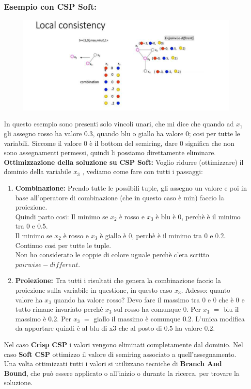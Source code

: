 \subsubsection{Esempio con CSP Soft:}
\begin{figure}[htp]
	\centering
    \includegraphics[width=14cm, keepaspectratio]{img/Cap5/LocalConsistency.png}
\end{figure}
\noindent In questo esempio sono presenti solo vincoli unari, che mi dice che quando ad $x_1$ gli assegno rosso ha valore 0.3, quando blu o giallo ha valore 0; cosi per tutte le variabili. Siccome il valore 0 è il bottom del semiring, dare 0 significa che non sono assegnamenti permessi, quindi li possiamo direttamente eliminare.\\
\textbf{Ottimizzazione della soluzione su CSP Soft: } Voglio ridurre (ottimizzare) il dominio della variabile $x_3$ , vediamo come fare con tutti i passaggi:
\begin{enumerate}
    \item \textbf{Combinazione:} Prendo tutte le possibili tuple, gli assegno un valore e poi in base all'operatore di combinazione (che in questo caso è min) faccio la proiezione.
    \\Quindi parto cosi:
    Il minimo se $x_2$ è rosso e $x_3$ è blu è 0, perchè è il minimo tra 0 e 0.5.
    \\Il minimo se $x_2$ è rosso e $x_3$ è giallo è 0, perchè è il minimo tra 0 e 0.2.
    \\Continuo cosi per tutte le tuple.
    \\Non ho considerato le coppie di colore uguale perchè c'era scritto $pairwise-different$.
    \item \textbf{Proiezione:} Tra tutti i risultati che genera la combinazione faccio la proiezione sulla variabile in questione, in questo caso $x_3$. Adesso: quanto valore ha $x_3$ quando ha valore rosso? Devo fare il massimo tra 0 e 0 che è 0 e tutto rimane invariato perché $x_3$ sul rosso ha comunque 0. Per $x_3$ $=$ blu il massimo è 0.2. Per $x_3$ $=$ giallo il massimo è comunque 0.2. L’unica modifica da apportare quindi è al blu di x3 che al posto di 0.5 ha valore 0.2.
\end{enumerate}
Nel caso \textbf{Crisp CSP} i valori vengono eliminati completamente dal dominio. Nel caso \textbf{Soft CSP} ottimizzo il valore di semiring associato a quell’assegnamento. Una volta ottimizzati tutti i valori si utilizzano tecniche di \textbf{Branch And Bound}, che può essere applicato o all’inizio o durante la ricerca, per trovare la soluzione.


